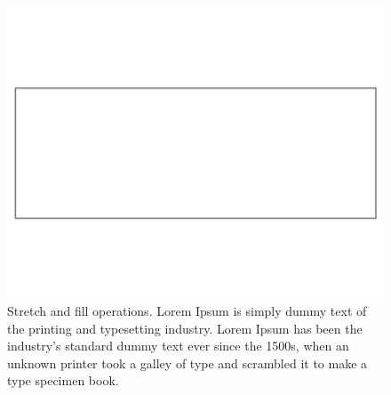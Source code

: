 \begin{figure}[htb!]
\begin{center}
\includegraphics[scale=0.3,angle=90]{figs/blankrectangle}
\caption{Stretch and fill operations. Lorem Ipsum is simply dummy text of the printing and typesetting industry. Lorem Ipsum has 
been the industry's standard dummy text ever since the 1500s, when an unknown printer took a galley of 
type and scrambled it to make a type specimen book.  }
\label{fig:attachandbind}
\end{center}
\end{figure}

